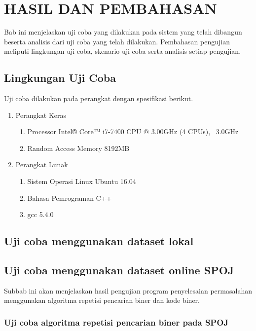 \chapter{HASIL DAN PEMBAHASAN}

Bab ini menjelaskan uji coba yang dilakukan pada sistem yang telah dibangun beserta analisis dari uji coba yang telah dilakukan. Pembahasan pengujian meliputi lingkungan uji coba, skenario uji coba serta analisis setiap pengujian.

\section{Lingkungan Uji Coba}

Uji coba dilakukan pada perangkat dengan spesifikasi berikut.

\begin{enumerate}
  \item Perangkat Keras
  \begin{enumerate}
    \item Processor Intel® Core™ i7-7400 CPU @ 3.00GHz (4 CPUs), ~3.0GHz
    \item Random Access Memory 8192MB
  \end{enumerate}
  \item Perangkat Lunak
  \begin{enumerate}
    \item Sistem Operasi Linux Ubuntu 16.04
    \item Bahasa Pemrograman C++
    \item gcc 5.4.0
  \end{enumerate}
\end{enumerate}

\section{Uji coba menggunakan dataset lokal}

\section{Uji coba menggunakan dataset online SPOJ}

Subbab ini akan menjelaskan hasil pengujian program penyelesaian permasalahan menggunakan algoritma repetisi pencarian biner dan kode biner.

\subsection{Uji coba algoritma repetisi pencarian biner pada SPOJ}

